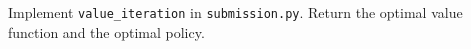 \item {}

Implement \texttt{value\_iteration} in \texttt{submission.py}. Return the optimal value function and the optimal policy.